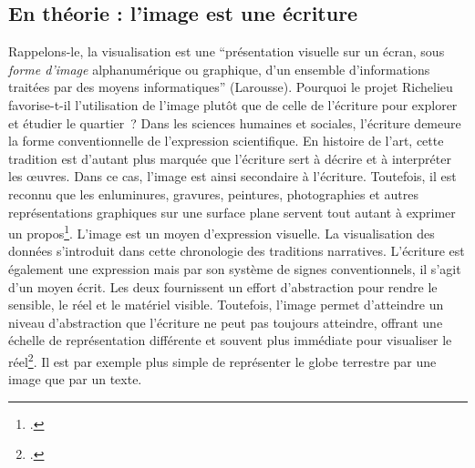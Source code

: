 \subsection{En théorie : l'image est une écriture}
Rappelons-le, la visualisation est une \enquote{présentation visuelle sur un écran, sous \textit{forme d'image} alphanumérique ou graphique, d'un ensemble d'informations traitées par des moyens informatiques} (Larousse). Pourquoi le projet Richelieu favorise-t-il l’utilisation de l’image plutôt que de celle de l'écriture pour explorer et étudier le quartier~?  Dans les sciences humaines et sociales, l'écriture demeure la forme conventionnelle de l'expression scientifique. En histoire de l'art, cette tradition est d'autant plus marquée que l'écriture sert à décrire et à interpréter les œuvres. Dans ce cas, l'image est ainsi secondaire à l'écriture. Toutefois, il est reconnu que les enluminures, gravures, peintures, photographies et autres représentations graphiques sur une surface plane servent tout autant à exprimer un propos\footcite{GRANDJEANIntroduction2015}. L'image est un moyen d'expression visuelle. La visualisation des données s'introduit dans cette chronologie des traditions narratives. L’écriture est également une expression mais par son système de signes conventionnels, il s'agit d'un moyen écrit. Les deux fournissent un effort d’abstraction pour rendre le sensible, le réel et le matériel visible. Toutefois, l’image permet d'atteindre un niveau d'abstraction que l'écriture ne peut pas toujours atteindre, offrant une échelle de représentation différente et souvent plus immédiate pour visualiser le réel\footcite{CHRISTINLecriture2020}. Il est par exemple plus simple de représenter le globe terrestre par une image que par un texte. 

